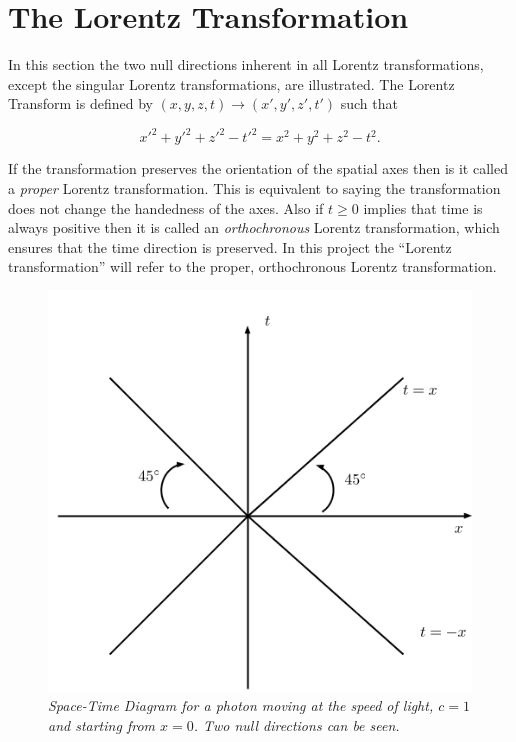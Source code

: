 \section{The Lorentz Transformation}

In this section the two null directions inherent in all Lorentz transformations, except the singular Lorentz transformations, are illustrated. The Lorentz Transform is defined by $(x,y,z,t) \rightarrow (x',y',z',t')$ such that

\begin{equation*}
{x'}^2 + {y'}^2 + {z'}^2 - {t'}^2 = x^2 + y^2 + z^2 - t^2.
\end{equation*}

\noindent If the transformation preserves the orientation of the spatial axes then is it called a \textit{proper} Lorentz transformation. This is equivalent to saying the transformation does not change the handedness of the axes. Also if $t \geq 0$ implies that time is always positive then it is called an \textit{orthochronous} Lorentz transformation, which ensures that the time direction is preserved. In this project the ``Lorentz transformation'' will refer to the proper, orthochronous Lorentz transformation.

\begin{figure}[h!]
\begin{center}
\caption{\textit{Space-Time Diagram for a photon moving at the speed of light, $c=1$ and starting from $x = 0$. Two null directions can be seen.}}
\label{figure_Photon_Space_Time}
\includegraphics[scale=0.8]{figs/1_1.jpg}
\end{center}
\end{figure}

